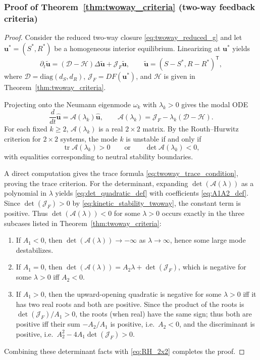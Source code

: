 \documentclass[pdflatex,sn-mathphys-ay]{sn-jnl}
\theoremstyle{thmstyleone}
\theoremstyle{definition}
\theoremstyle{remark}
\begin{document}
\subsubsection*{Proof of Theorem~\ref{thm:twoway_criteria} (two-way feedback criteria)}
\begin{proof}
Consider the reduced two-way closure \eqref{eq:twoway_reduced_g} and let $\mathbf{u}^*=(S^*,R^*)$ be a homogeneous interior equilibrium.
Linearizing at $\mathbf{u}^*$ yields
\[
\partial_t \tilde{\mathbf{u}}=(\mathcal{D}-\mathcal{H})\Delta \tilde{\mathbf{u}}+\mathcal{J}_F\tilde{\mathbf{u}},
\qquad
\tilde{\mathbf{u}}=(S-S^*,R-R^*)^{\mathsf T},
\]
where $\mathcal{D}=\mathrm{diag}(d_S,d_R)$, $\mathcal{J}_F=DF(\mathbf{u}^*)$, and $\mathcal{H}$ is given in Theorem~\ref{thm:twoway_criteria}.

Projecting onto the Neumann eigenmode $\omega_k$ with $\lambda_k>0$ gives the modal ODE
\[
\frac{d}{dt}\hat{\mathbf{u}}=\mathcal{A}(\lambda_k)\hat{\mathbf{u}},
\qquad
\mathcal{A}(\lambda_k)=\mathcal{J}_F-\lambda_k(\mathcal{D}-\mathcal{H}).
\]
For each fixed $k\ge2$, $\mathcal{A}(\lambda_k)$ is a real $2\times2$ matrix.
By the Routh--Hurwitz criterion for $2\times2$ systems, the mode $k$ is unstable if and only if
\begin{equation}
\label{eq:RH_2x2}
\operatorname{tr}\mathcal{A}(\lambda_k)>0
\qquad \text{or}\qquad
\det\mathcal{A}(\lambda_k)<0,
\end{equation}
with equalities corresponding to neutral stability boundaries.

A direct computation gives the trace formula \eqref{eq:twoway_trace_condition}, proving the trace criterion.
For the determinant, expanding $\det(\mathcal{A}(\lambda))$ as a polynomial in $\lambda$ yields \eqref{eq:det_quadratic_def}
with coefficients \eqref{eq:A1A2_def}. Since $\det(\mathcal{J}_F)>0$ by \eqref{eq:kinetic_stability_twoway}, the constant term is positive.
Thus $\det(\mathcal{A}(\lambda))<0$ for some $\lambda>0$ occurs exactly in the three subcases listed in Theorem~\ref{thm:twoway_criteria}:
\begin{enumerate}[label=(\roman*)]
\item If $A_1<0$, then $\det(\mathcal{A}(\lambda))\to -\infty$ as $\lambda\to\infty$, hence some large mode destabilizes.
\item If $A_1=0$, then $\det(\mathcal{A}(\lambda))=A_2\lambda+\det(\mathcal{J}_F)$, which is negative for some $\lambda>0$ iff $A_2<0$.
\item If $A_1>0$, then the upward-opening quadratic is negative for some $\lambda>0$ iff it has two real roots and both are positive.
Since the product of the roots is $\det(\mathcal{J}_F)/A_1>0$, the roots (when real) have the same sign; thus both are positive iff
their sum $-A_2/A_1$ is positive, i.e.\ $A_2<0$, and the discriminant is positive, i.e.\ $A_2^2-4A_1\det(\mathcal{J}_F)>0$.
\end{enumerate}
Combining these determinant facts with \eqref{eq:RH_2x2} completes the proof.
\end{proof}
\end{document}
